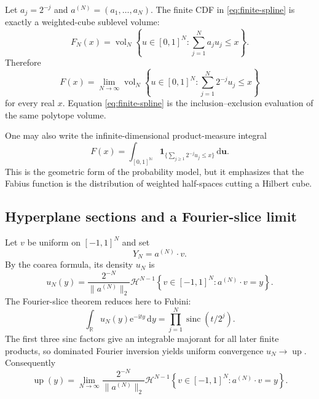 \documentclass[11pt,oneside]{article}
\theoremstyle{definition}
\theoremstyle{remark}
\newcommand{\R}{\mathbb R}
\newcommand{\N}{\mathbb N}
\newcommand{\Up}{\operatorname{up}}
\newcommand{\sinc}{\operatorname{sinc}}
\newcommand{\dd}{\,\mathrm d}
\newcommand{\ii}{\mathrm i}
\newcommand{\e}{\mathrm e}
\newcommand{\1}{\mathbf 1}
\newcommand{\Haus}{\mathcal H}
\begin{document}
Let $a_j=2^{-j}$ and $a^{(N)}=(a_1,\ldots,a_N)$.  The finite CDF in
\eqref{eq:finite-spline} is exactly a weighted-cube sublevel volume:
\begin{equation}
 \boxed{\displaystyle
 F_N(x)=\operatorname{vol}_N
 \left\{u\in[0,1]^N:\sum_{j=1}^{N}a_ju_j\le x\right\}.} \label{eq:cube-sublevel}
\end{equation}
Therefore
\begin{equation}
 \boxed{\displaystyle
 F(x)=\lim_{N\to\infty}\operatorname{vol}_N
 \left\{u\in[0,1]^N:\sum_{j=1}^{N}2^{-j}u_j\le x\right\}}              \label{eq:cube-volume-limit}
\end{equation}
for every real $x$.  Equation \eqref{eq:finite-spline} is the
inclusion--exclusion evaluation of the same polytope volume.

One may also write the infinite-dimensional product-measure integral
\begin{equation}
 F(x)=\int_{[0,1]^\N}
 \1_{\{\sum_{j\ge1}2^{-j}u_j\le x\}}\dd\bm u.           \label{eq:infinite-cube-integral}
\end{equation}
This is the geometric form of the probability model, but it emphasizes that
the Fabius function is the distribution of weighted half-spaces cutting a
Hilbert cube.

\subsection{Hyperplane sections and a Fourier-slice limit}

Let $v$ be uniform on $[-1,1]^N$ and set
\begin{equation}
 Y_N=a^{(N)}\cdot v.
\end{equation}
By the coarea formula, its density $u_N$ is
\begin{equation}
 \boxed{\displaystyle
 u_N(y)=\frac{2^{-N}}{\|a^{(N)}\|_2}
 \Haus^{N-1}
 \left\{v\in[-1,1]^N:a^{(N)}\cdot v=y\right\}.}         \label{eq:cube-section-density}
\end{equation}
The Fourier-slice theorem reduces here to Fubini:
\begin{equation}
 \int_{\R}u_N(y)\e^{-\ii ty}\dd y
 =\prod_{j=1}^{N}\sinc(t/2^j).                           \label{eq:cube-fourier-slice}
\end{equation}
The first three sinc factors give an integrable majorant for all later finite
products, so dominated Fourier inversion yields uniform convergence
$u_N\to\Up$.  Consequently
\begin{equation}
 \boxed{\displaystyle
 \Up(y)=\lim_{N\to\infty}
 \frac{2^{-N}}{\|a^{(N)}\|_2}
 \Haus^{N-1}
 \left\{v\in[-1,1]^N:a^{(N)}\cdot v=y\right\}.}         \label{eq:cube-section-limit}
\end{equation}
\end{document}
